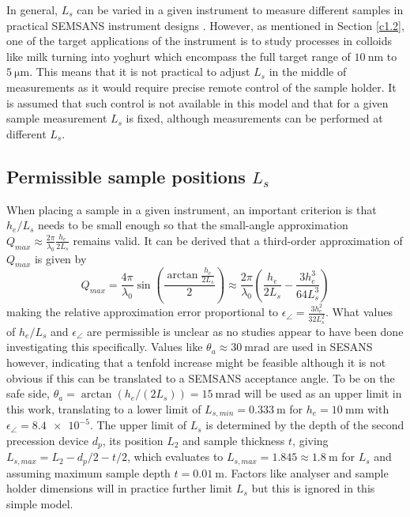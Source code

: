 In general, $L_s$ can be varied in a given instrument to measure different samples in practical SEMSANS instrument designs \cite{kusmin2017}. However, as mentioned in Section \ref{c1.2}, one of the target applications of the instrument is to study processes in colloids like milk turning into yoghurt which encompass the full target range of $\SI{10}{\nano\meter}$ to $\SI{5}{\micro\meter}$. This means that it is not practical to adjust $L_s$ in the middle of measurements as it would require precise remote control of the sample holder. It is assumed that such control is not available in this model and that for a given sample measurement $L_s$ is fixed, although measurements can be performed at different $L_s$.  

\subsection{Permissible sample positions $L_s$}
When placing a sample in a given instrument, an important criterion is that $h_e/L_s$ needs to be small enough so that the small-angle approximation $Q_{max} \approx \frac{2\pi}{\lambda_0}\frac{h_e}{2L_s}$ remains valid. It can be derived that a third-order approximation of $Q_{max}$ is given by
$$Q_{max} = \frac{4\pi}{\lambda_0}\sin(\frac{\arctan\frac{h_e}{2L_s}}{2}) \approx  \frac{2\pi}{\lambda_0}(\frac{h_e}{2L_s} - \frac{3h_e^3}{64L_s^3})$$
making the relative approximation error proportional to $\epsilon_\angle = \frac{3h_e^2}{32L_s^2}$. What values of $h_e/L_s$ and $\epsilon_\angle$ are permissible is unclear as no studies appear to have been done investigating this specifically. Values like $\theta_a \approx \SI{30}{\milli\radian}$ are used in SESANS \cite{rekveldt1996} however, indicating that a tenfold increase might be feasible although it is not obvious if this can be translated to a SEMSANS acceptance angle. To be on the safe side, $\theta_a = \arctan\left(h_e / (2L_s)\right) = \SI{15}{\milli\radian}$ will be used as an upper limit in this work, translating to a lower limit of $L_{s,min} = \SI{0.333}{\meter}$ for $h_e = \SI{10}{\milli\meter}$ with $\epsilon_\angle = \num{8.4e-5}$. 
The upper limit of $L_s$ is determined by the depth of the second precession device $d_p$, its position $L_2$ and sample thickness $t$, giving $L_{s,max} = L_2 - d_p / 2 - t/2$, which evaluates to $L_{s,max} = 1.845 \approx \SI{1.8}{\meter}$ for $L_s$ and assuming maximum sample depth $t=\SI{0.01}{\meter}$. Factors like analyser and sample holder dimensions will in practice further limit $L_s$ but this is ignored in this simple model.
